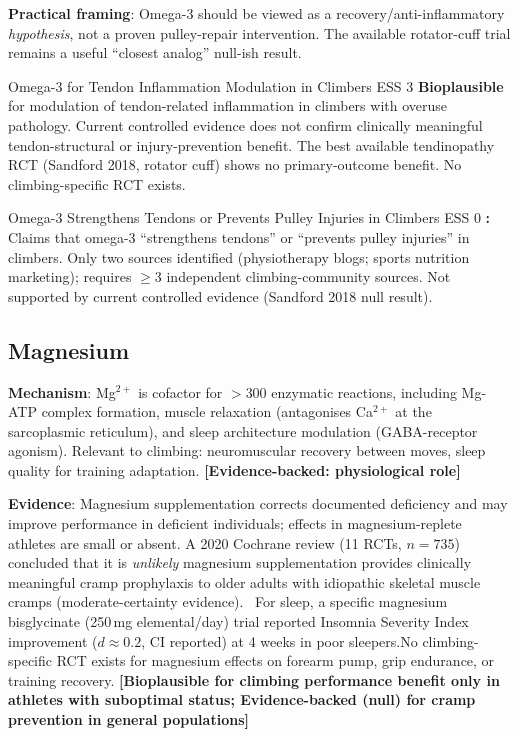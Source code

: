 \textbf{Practical framing}: Omega-3 should be viewed as a recovery/anti-inflammatory \textit{hypothesis}, not a proven pulley-repair intervention. The available rotator-cuff trial remains a useful ``closest analog'' null-ish result.

\begin{bioplausbox}{Omega-3 for Tendon Inflammation Modulation in Climbers \cdot \bioplausible \cdot ESS 3}
\textbf{Bioplausible} for modulation of tendon-related inflammation in climbers with overuse pathology. Current controlled evidence does not confirm clinically meaningful tendon-structural or injury-prevention benefit. The best available tendinopathy RCT (Sandford 2018, rotator cuff) shows no primary-outcome benefit. No climbing-specific RCT exists.
\end{bioplausbox}

\begin{toverifybox}{Omega-3 Strengthens Tendons or Prevents Pulley Injuries in Climbers \cdot \toverify \cdot ESS 0}
\textbf{\toverify:} Claims that omega-3 ``strengthens tendons'' or ``prevents pulley injuries'' in climbers. Only two sources identified (physiotherapy blogs; sports nutrition marketing); requires $\geq$3 independent climbing-community sources. Not supported by current controlled evidence (Sandford 2018 null result).
\end{toverifybox}

\subsection{Magnesium}
\label{subsec:magnesium}

\textbf{Mechanism}: Mg$^{2+}$ is cofactor for $>$300 enzymatic reactions, including Mg-ATP complex formation, muscle relaxation (antagonises Ca$^{2+}$ at the sarcoplasmic reticulum), and sleep architecture modulation (GABA-receptor agonism). Relevant to climbing: neuromuscular recovery between moves, sleep quality for training adaptation. \textbf{[Evidence-backed: physiological role]}

\textbf{Evidence}: Magnesium supplementation corrects documented deficiency and may improve performance in deficient individuals; effects in magnesium-replete athletes are small or absent. A 2020 Cochrane review (11 RCTs, $n{=}735$) concluded that it is \textit{unlikely} magnesium supplementation provides clinically meaningful cramp prophylaxis to older adults with idiopathic skeletal muscle cramps (moderate-certainty evidence).\ \cite{Garrison20} For sleep, a specific magnesium bisglycinate (250\,mg elemental/day) trial reported Insomnia Severity Index improvement ($d{\approx}0.2$, CI reported) at 4 weeks in poor sleepers.\singlesource No climbing-specific RCT exists for magnesium effects on forearm pump, grip endurance, or training recovery. \textbf{[Bioplausible for climbing performance benefit only in athletes with suboptimal status; Evidence-backed (null) for cramp prevention in general populations]}

